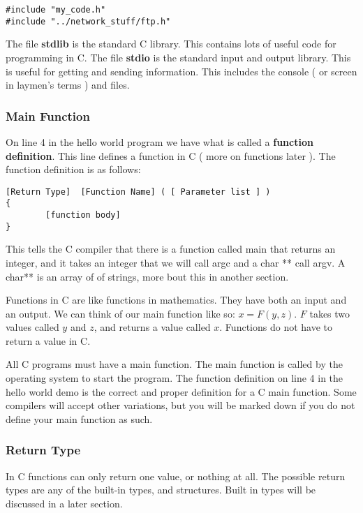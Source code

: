 \documentclass[10pt,a4paper]{paper}
\begin{document}
\begin{lstlisting}
#include "my_code.h"
#include "../network_stuff/ftp.h"
\end{lstlisting}

The file \textbf{stdlib} is the standard C library.  This contains lots of useful code for programming in C.  The file \textbf{stdio} is the standard input and output library.  This is useful for getting and sending information.  This includes the console ( or screen in laymen's terms  ) and files.

\subsubsection*{Main Function}

On line 4 in the hello world program we have what is called a \textbf{function definition}.  This line defines a function in C ( more on functions later ).
The function definition is as follows:

\begin{verbatim}
[Return Type]  [Function Name] ( [ Parameter list ] ) 
{     
		[function body]
}
\end{verbatim}

This tells the C compiler that there is a function called main that returns an integer, and it takes an integer that we will call argc and a char ** call argv. A char** is an array of of strings, more bout this in another section.

Functions in C are like functions in mathematics.  They have both an input and an output.  We can think of our main function like so: $ x = F(y,z) $. $F$ takes two values called $y$ and $z$, and returns a value called $x$.  Functions do not have to return a value in C.

All C programs must have a main function.  The main function is called by the operating system to start the program.  The function definition on line 4 in the hello world demo is the correct and proper definition for a C main function.  Some compilers will accept other variations, but you will be marked down if you do not define your main function as such.

\subsubsection*{Return Type}
In C functions can only return one value, or nothing at all.  The possible return types are any of the built-in types, and structures.  Built in types will be discussed in a later section.
\end{document}
